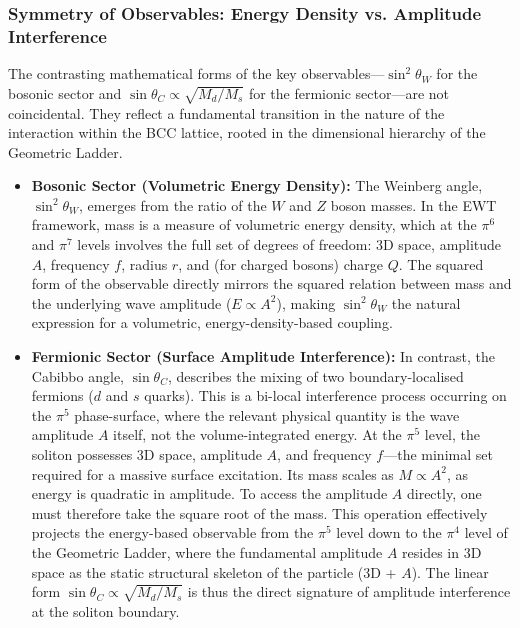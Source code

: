 \documentclass[10pt,a4paper]{article}
\begin{document}
\subsubsection{Symmetry of Observables: Energy Density vs. Amplitude Interference}
\label{sec:symmetry_observables}

The contrasting mathematical forms of the key observables---\(\sin^2\theta_W\) for the bosonic sector and \(\sin\theta_C \propto \sqrt{M_d/M_s}\) for the fermionic sector---are not coincidental. They reflect a fundamental transition in the nature of the interaction within the BCC lattice, rooted in the dimensional hierarchy of the Geometric Ladder.

\begin{itemize}
	\item \textbf{Bosonic Sector (Volumetric Energy Density):}
	The Weinberg angle, \(\sin^2\theta_W\), emerges from the ratio of the \(W\) and \(Z\) boson masses. In the EWT framework, mass is a measure of volumetric energy density, which at the \(\pi^6\) and \(\pi^7\) levels involves the full set of degrees of freedom: 3D space, amplitude \(A\), frequency \(f\), radius \(r\), and (for charged bosons) charge \(Q\). The squared form of the observable directly mirrors the squared relation between mass and the underlying wave amplitude (\(E \propto A^2\)), making \(\sin^2\theta_W\) the natural expression for a volumetric, energy-density-based coupling.
	
	\item \textbf{Fermionic Sector (Surface Amplitude Interference):}
	In contrast, the Cabibbo angle, \(\sin\theta_C\), describes the mixing of two boundary-localised fermions (\(d\) and \(s\) quarks). This is a bi-local interference process occurring on the \(\pi^5\) phase-surface, where the relevant physical quantity is the wave amplitude \(A\) itself, not the volume-integrated energy. At the \(\pi^5\) level, the soliton possesses 3D space, amplitude \(A\), and frequency \(f\)---the minimal set required for a massive surface excitation. Its mass scales as \(M \propto A^2\), as energy is quadratic in amplitude. To access the amplitude \(A\) directly, one must therefore take the square root of the mass. This operation effectively projects the energy-based observable from the \(\pi^5\) level down to the \(\pi^4\) level of the Geometric Ladder, where the fundamental amplitude \(A\) resides in 3D space as the static structural skeleton of the particle (3D + \(A\)). The linear form \(\sin\theta_C \propto \sqrt{M_d/M_s}\) is thus the direct signature of amplitude interference at the soliton boundary.
\end{itemize}
\end{document}
